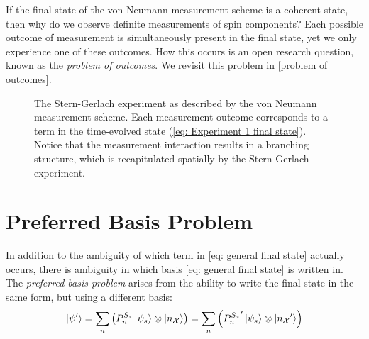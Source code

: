 If the final state of the von Neumann measurement scheme is a coherent state, then why do we observe definite measurements of spin components? Each possible outcome of measurement is simultaneously present in the final state, yet we only experience one of these outcomes. How this occurs is an open research question, known as the \textit{problem of outcomes}. We revisit this problem in \autoref{problem of outcomes}.
\begin{figure}
\centering\CaptionFontSize
{}

\caption[Insert an abbreviated caption here to show in the List of Figures]
{The Stern-Gerlach experiment as described by the von Neumann measurement scheme. Each measurement outcome corresponds to a term in the time-evolved state (\autoref{eq: Experiment 1 final state}). Notice that the measurement interaction results in a branching structure, which is recapitulated spatially by the Stern-Gerlach experiment.}
\label{Figure:vnm experiment 1}
\end{figure}

\section{Preferred Basis Problem}
In addition to the ambiguity of which term in \autoref{eq: general final state} actually occurs, there is ambiguity in which basis \autoref{eq: general final state} is written in. The \textit{preferred basis problem} arises from the ability to write the final state in the same form, but using a different basis:
\begin{align}  \label{eq: preferred basis state general}
  \ket{\psi'} = \sum_{n}\left(P^{S_z}_n\ket{\psi_s} \otimes \ket{n_\mathcal{X}}\right) = \sum_{n}\left({P^{S_z}_{n}}' \ket{\psi_s} \otimes \ket{{n_\mathcal{X}}'}\right)
\end{align}

